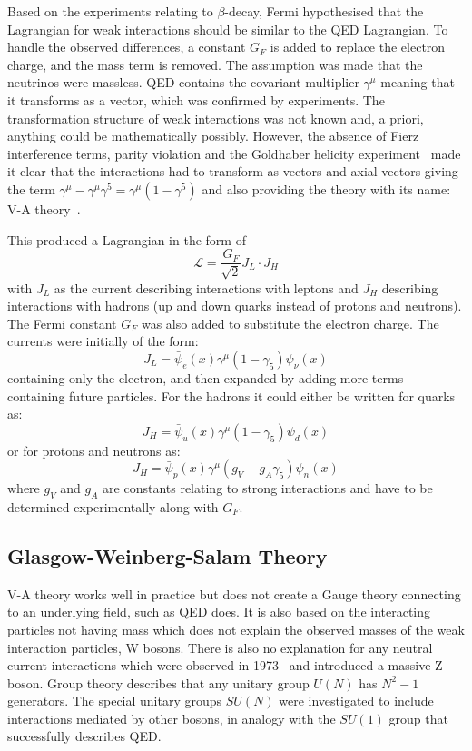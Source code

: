 Based on the experiments relating to $\beta$-decay, Fermi hypothesised that the Lagrangian for weak interactions should be similar to the QED Lagrangian. To handle the observed differences, a constant $G_F$ is added to replace the electron charge, and the mass term is removed. The assumption was made that the neutrinos were massless. QED contains the covariant multiplier $\gamma^\mu$ meaning that it transforms as a vector, which was confirmed by experiments. The transformation structure  of weak interactions was not known and, a priori, anything could be mathematically possibly. However, the absence of Fierz interference terms, parity violation and the Goldhaber helicity experiment~\cite{1Helicity} made it clear that the interactions had to transform as vectors and axial vectors giving the term $\gamma^\mu - \gamma^\mu \gamma^5 =  \gamma^\mu (1- \gamma^5)$ and also providing the theory with its name: V-A theory~\cite{90Feynman}. 

This produced a Lagrangian in the form of 
\begin{equation}
\mathcal{L} = \frac{G_F}{\sqrt{2}}J_L \cdot J_H
\end{equation}
with $J_L$ as the current describing interactions with leptons and $J_H$ describing interactions with hadrons (up and down quarks instead of protons and neutrons). The Fermi constant $G_F$ was also added to substitute the electron charge. The currents were initially of the form:
\begin{equation}
J_L = \bar{\psi}_e(x)\gamma^\mu (1-\gamma_5) \psi_\nu(x)
\end{equation}
containing only the electron, and then expanded by adding more terms containing future particles. For the hadrons it could either be written for quarks as:
\begin{equation}
J_H = \bar{\psi}_u(x)\gamma^\mu (1-\gamma_5) \psi_d(x)
\end{equation}
or for protons and neutrons as:
\begin{equation}
J_H = \bar{\psi}_p(x)\gamma^\mu (g_V-g_A\gamma_5) \psi_n(x)
\end{equation}
where $g_V$ and $g_A$ are constants relating to strong interactions and have to be determined experimentally along with $G_F$.

\subsection{Glasgow-Weinberg-Salam Theory}\label{subsection:SMN}
V-A theory works well in practice but does not create a Gauge theory connecting to an underlying field, such as QED does. It is also based on the interacting particles not having mass which does not explain the observed masses of the weak interaction particles, W bosons. There is also no explanation for any neutral current interactions which were observed in 1973~\cite{91Hasert} and introduced a massive Z boson. Group theory describes that any unitary group $U(N)$ has $N^2 -1$ generators. The special unitary groups $SU(N)$ were investigated to include interactions mediated by other bosons, in analogy with the $SU(1)$ group that successfully describes QED.

